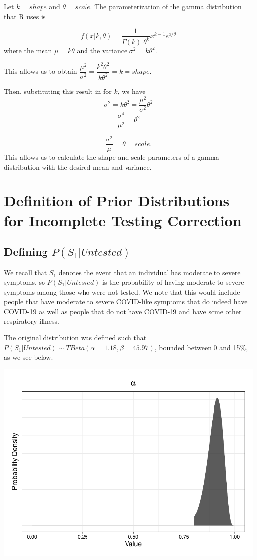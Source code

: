 \documentclass[12pt,twoside]{smiththesis}
\begin{document}
Let \(k=shape\) and \(\theta=scale\). The parameterization of the gamma distribution that R uses is

\[f(x|k,\theta) = \frac{1}{\Gamma(k) \;\theta^k}x^{k-1} e^{x/\theta}\]
where the mean \(\mu =k\theta\) and the variance \(\sigma^2 = k\theta^2\).

This allows us to obtain \(\dfrac{\mu^2}{\sigma^2} = \dfrac{k^2 \theta^2}{k\theta^2} = k =shape\).

Then, substituting this result in for \(k\), we have \[\sigma^2 = k \theta^2 = \dfrac{\mu^2}{\sigma^2} \theta^2\]
\[\frac{\sigma^4}{\mu^2}=\theta^2\]

\[\frac{\sigma^2}{\mu}=\theta = scale.\]
This allows us to calculate the shape and scale parameters of a gamma distribution with the desired mean and variance.

\hypertarget{definition-of-prior-distributions-for-incomplete-testing-correction}{%
\section{Definition of Prior Distributions for Incomplete Testing Correction}\label{definition-of-prior-distributions-for-incomplete-testing-correction}}

\hypertarget{defining-ps_1untested}{%
\subsection{\texorpdfstring{Defining \(P(S_1|Untested)\)}{Defining P(S\_1\textbar Untested)}}\label{defining-ps_1untested}}

We recall that \(S_1\) denotes the event that an individual has moderate to severe symptoms, so
\(P(S_1|Untested)\) is the probability of having moderate to severe symptoms among those who were not tested. We note that this would include people that have moderate to severe COVID-like symptoms that do indeed have COVID-19 as well as people that do not have COVID-19 and have some other respiratory illness.

The original distribution was defined such that \(P(S_1|Untested) \sim TBeta(\alpha = 1.18, \beta = 45.97)\), bounded between 0 and 15\%, as we see below.
\begin{center}\includegraphics[width=0.8\linewidth]{thesis_files/figure-latex/unnamed-chunk-48-1} \end{center}
\end{document}
